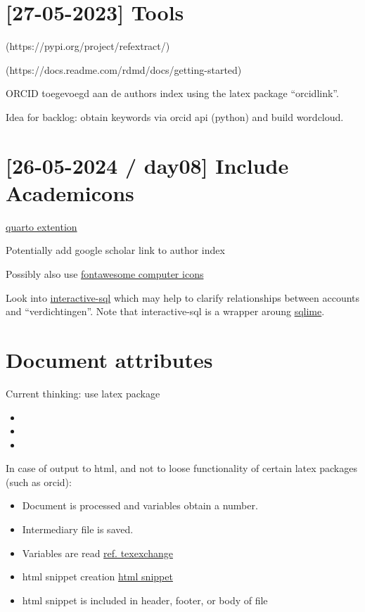 \documentclass[
  letterpaper,
  DIV=11,
  numbers=noendperiod]{scrreprt}
\providecommand{\tightlist}{%
  \setlength{\itemsep}{0pt}\setlength{\parskip}{0pt}}\usepackage{longtable,booktabs,array}
\begin{document}
\hypertarget{tools}{%
\section{{[}27-05-2023{]} Tools}\label{tools}}

(https://pypi.org/project/refextract/)

(https://docs.readme.com/rdmd/docs/getting-started)

ORCID toegevoegd aan de authors index using the latex package
``orcidlink''.

Idea for backlog: obtain keywords via orcid api (python) and build
wordcloud.

\hypertarget{day08-include-academicons}{%
\section{{[}26-05-2024 / day08{]} Include
Academicons}\label{day08-include-academicons}}

\href{https://schochastics.quarto.pub/academicons-quarto-extension/}{quarto
extention}

Potentially add google scholar link to author index

Possibly also use
\href{https://www.w3schools.com/icons/fontawesome5_icons_computers.asp}{fontawesome
computer icons}

Look into
\href{https://shafayetshafee.github.io/interactive-sql/example.html}{interactive-sql}
which may help to clarify relationships between accounts and
``verdichtingen''. Note that interactive-sql is a wrapper aroung
\href{https://sqlime.org/about.html}{sqlime}.

\hypertarget{document-attributes}{%
\section{Document attributes}\label{document-attributes}}

Current thinking: use latex package

\begin{itemize}
\item
  \totcounter
\item
\item
\end{itemize}

In case of output to html, and not to loose functionality of certain
latex packages (such as orcid):

\begin{itemize}
\tightlist
\item
  Document is processed and variables obtain a number.
\item
  Intermediary file is saved.
\item
  Variables are read
  \href{https://tex.stackexchange.com/questions/321346/how-to-read-a-variable-from-a-file-in-latex}{ref.
  texexchange}
\item
  html snippet creation \href{https://texfaq.org/FAQ-LaTeX2HTML}{html
  snippet}
\item
  html snippet is included in header, footer, or body of file
\end{itemize}
\end{document}
